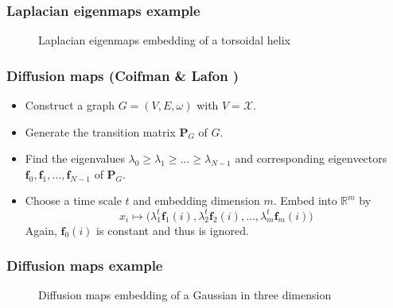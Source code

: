 \documentclass[professionalfonts,hyperref={colorlinks=true,linkcolor=red}]{beamer}
\begin{document}
\begin{frame}[label=laplacian_example]
  \frametitle{Laplacian eigenmaps example}
  \begin{figure}[htbp]
    \label{fig:helix}
    \centering
    \hspace{3pt}
    \caption{Laplacian eigenmaps embedding of a torsoidal helix}
  \end{figure}
\end{frame}

\begin{frame}[label=diffusion_maps]
  \frametitle{Diffusion maps (Coifman \& Lafon
    \cite{coifman06:_diffus_maps})}
  \begin{itemize}
  \item<2-> Construct a graph $G = (V,E,\omega)$ with $V =
    \mathcal{X}$.
  \item<3-> Generate the transition matrix $\bm{P}_G$ of $G$.
  \item<4-> Find the eigenvalues $\lambda_0 \geq \lambda_1 \geq \dots
    \geq \lambda_{N-1}$ and corresponding eigenvectors $\bm{f}_0, \bm{f}_1,
    \dots, \bm{f}_{N-1}$ of $\bm{P}_G$.
  \item<5-> Choose a time scale $t$ and embedding dimension $m$. Embed
    into $\mathbb{R}^{m}$ by
    \begin{equation}
      \label{eq:6}
      x_i \mapsto \bigl( \lambda_{1}^{t} \bm{f}_{1}(i),
      \lambda_{2}^{t} \bm{f}_{2}(i), \dots, \lambda_{m}^{t}
      \bm{f}_{m}(i))
    \end{equation}
    Again, $\bm{f}_{0}(i)$ is constant and thus is ignored. 
  \end{itemize}
\end{frame}

\begin{frame}[label=diffusion_example]
  \frametitle{Diffusion maps example}
  \begin{figure}[htbp]
    \label{fig:gaussian}
    \centering
    \hspace{3pt}
    \caption{Diffusion maps embedding of a Gaussian in three dimension}
  \end{figure}
\end{frame}
\end{document}
